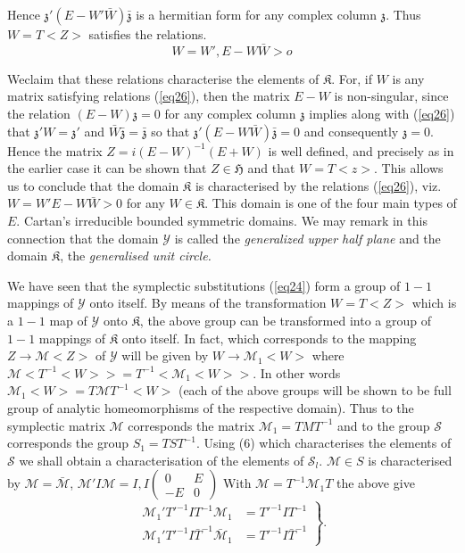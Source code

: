 Hence $\mathfrak{z}' (E - W' \bar{W}) \bar{\mathfrak{z}}$ is a
hermitian form for any complex column $\mathfrak{z}$. Thus $W = T < Z
>$ satisfies the relations. 
\begin{equation*}
W = W', E - W \bar{W} > o \tag{26}\label{eq26} 
\end{equation*}

We\pageoriginale claim that these relations characterise the elements of
$\mathfrak{K}$. For, if $W$ is any matrix satisfying relations (\ref{eq26}),
then the matrix $E-W$ is non-singular, since the relation $(E-W)
\mathfrak{z} =0$ for any complex column $\mathfrak{z}$ implies along
with (\ref{eq26}) that $\mathfrak{z}' W = \mathfrak{z}'$ and
$\bar{W} \bar{\mathfrak{z}} =  \bar{\mathfrak{z}}$ so that
$\mathfrak{z}' (E - W  \bar{W})  \bar{\mathfrak{z}} = 0$ and
consequently $\mathfrak{z} = 0$. Hence the matrix $Z =i(E -W)^{-1} (
E+W )$ is well defined, and precisely  as in the earlier case it can
be shown that $Z \in \mathfrak{H}$ and that $W = T <z>$. This allows
us to conclude that
the domain $\mathfrak{K}$ is characterised by the relations (\ref{eq26}),
viz. $W=W' E -W\bar{W} > 0$ for any $W \in \mathfrak{K}$. This
domain is one of the four main types of $E$. Cartan's irreducible
bounded symmetric domains. We may remark in this connection that the
domain $\mathscr{Y}$ is called the \textit{generalized upper half
  plane} and the domain $\mathfrak{K}$, the \textit{generalised unit
  circle.}  

We have seen that the symplectic substitutions (\ref{eq24}) form a group of
$1-1$ mappings of $\mathscr{Y}$ onto itself. By means of the
transformation $W = T < Z >$ which is a $1-1$ map of $\mathscr{Y}$ onto
$\mathfrak{K}$, the above group can be transformed into a group of
$1-1$ mappings of $\mathfrak{K}$ onto itself. In fact, which
corresponds to the mapping $Z \to \mathcal{M} < Z >$ of $\mathscr{Y}$
will be 
given by $W \to \mathcal{M}_1 < W >$ where $\mathcal{M} <T^{-1} < W >>
= T^{-1} <\mathcal{M}_1 < W 
>>$. In other words $\mathcal{M}_1 < W > = T \mathcal{M} T^{-1} < W >$
(each of the above 
groups will be shown to be full group of analytic homeomorphisms of
the respective domain). Thus to the symplectic matrix $\mathcal{M}$
corresponds 
the matrix $\mathcal{M}_1 = TMT^{-1}$ and to the group $\mathcal{S}$
corresponds the group $S_1 = TST^{-1}$. Using (6) which
characterises the elements of $\mathcal{S}$ we shall obtain a
characterisation of the elements of $\mathcal{S}_l$. $\mathcal{M}
\in S$ is characterised by $\mathcal{M} = \bar{\mathcal{M}}$, $\mathcal{M}' I
\mathcal{M} = I,I \begin{pmatrix}  0 & E 
  \\ -E & 0\end{pmatrix}$  With $\mathcal{M} = T^{-1} \mathcal{M}_1 T$
  the above give   
\begin{equation*}
\left. 
\begin{aligned}
\mathcal{M}_1' T'^{-1} I T^{-1} \mathcal{M}_1 & = T'^{-1} I T^{-1}\\
\mathcal{M}_1'T'^{-1} I \bar{T}^{-1} \bar{\mathcal{M}}_1& = T'^{-1} I
\bar{T}^{-1} 
 \end{aligned} 
 \right \}.
 \end{equation*}\pageoriginale
  
